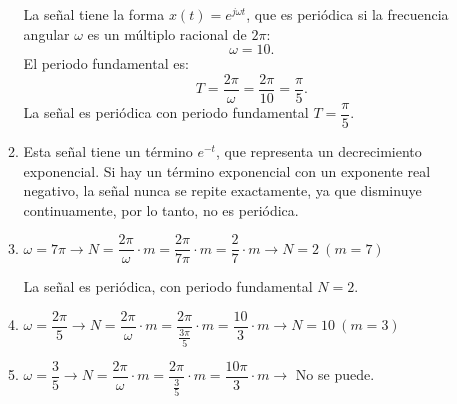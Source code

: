 \begin{enumerate}[label=\color{red}\textbf{\arabic*)}]
\begin{enumerate}[label=\color{red}\textbf{\alph*)}]
        La señal tiene la forma $x(t)=e^{j\omega t} $, que es periódica si la frecuencia angular $\omega$ es un múltiplo racional de $2\pi$: \[
        \omega=10.
        \] 
        El periodo fundamental es: \[
        T=\dfrac{2\pi}{\omega}=\dfrac{2\pi}{10}=\dfrac{\pi}{5}.
        \] 
        La señal es periódica con periodo fundamental $T=\dfrac{\pi}{5}$.
      \item {} 

        Esta señal tiene un término $e^{-t} $, que representa un decrecimiento exponencial. Si hay un término exponencial con un exponente real negativo, la señal nunca se repite exactamente, ya que disminuye continuamente, por lo tanto, no es periódica.
      \item {} 

        $\omega=7\pi\longrightarrow N=\dfrac{2\pi}{\omega}\cdot m=\dfrac{2\pi}{7\pi}\cdot m=\dfrac{2}{7}\cdot m\longrightarrow N=2\:(m=7)$

        La señal es periódica, con periodo fundamental $N=2$.
      \item {} 

        $\omega=\dfrac{2\pi}{5}\longrightarrow N=\dfrac{2\pi}{\omega}\cdot m=\dfrac{2\pi}{\frac{3\pi}{5} }\cdot m=\dfrac{10}{3}\cdot m\longrightarrow N=10\:(m=3)$
      \item {} 

        $\omega=\dfrac{3}{5}\longrightarrow N=\dfrac{2\pi}{\omega}\cdot m=\dfrac{2\pi}{\frac{3}{5} }\cdot m=\dfrac{10\pi}{3}\cdot m\longrightarrow $ No se puede.


\end{enumerate}
\end{enumerate}

